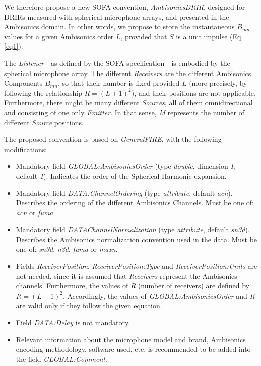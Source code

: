 We therefore propose a new SOFA convention, \textit{AmbisonicsDRIR}, designed for DRIRs measured with spherical microphone arrays, and presented in the Ambisonics domain. In other words, we propose to store the instantaneous $B_{mn}$ values for a given Ambisonics order $L$, provided that $S$ is a unit impulse (Eq. \ref{eq1}).

The \textit{Listener} - as defined by the SOFA specification - is embodied by the spherical microphone array. The different \textit{Receivers} are the different Ambisonics Components $B_{mn}$, so that their number is fixed provided $L$ (more precisely, by following the relationship $R = (L+1)^2$), and their positions are not applicable. Furthermore, there might be many different \textit{Sources}, all of them omnidirectional and consisting of one only \textit{Emitter}. In that sense, \textit{M} represents the number of different \textit{Source} positions. 


The proposed convention is based on \textit{GeneralFIRE}, with the following modifications:
\begin{itemize}

    \item Mandatory field \textit{GLOBAL:AmbisonicsOrder} (type \textit{double}, dimension \textit{I}, default \textit{1}). Indicates the order of the Spherical Harmonic expansion.
    
    \item Mandatory field \textit{DATA:ChannelOrdering} (type \textit{attribute}, default \textit{acn}). Describes the ordering of the different Ambisonics Channels. Must be one of: \textit{acn} or \textit{fuma}.
    
    \item Mandatory field \textit{DATAChannelNormalization} (type \textit{attribute}, default \textit{sn3d}). Describes the Ambisonics normalization convention used in the data. Must be one of: \textit{sn3d}, \textit{n3d}, \textit{fuma} or \textit{maxn}.
    
    \item Fields \textit{ReceiverPosition}, \textit{ReceiverPosition:Type} and \textit{ReceiverPosition:Units} are not needed, since it is assumed that \textit{Receivers} represent the Ambisonics channels. Furthermore, the values of \textit{R} (number of receivers) are defined by $R = (L+1)^2$. Accordingly, the values of \textit{GLOBAL:AmbisonicsOrder} and \textit{R} are valid only if they follow the given equation.
    
    \item Field \textit{DATA:Delay} is not mandatory.
    
    \item Relevant information about the microphone model and brand, Ambisonics encoding methodology, software used, etc, is recommended to be added into the field \textit{GLOBAL:Comment}.
    
\end{itemize}

